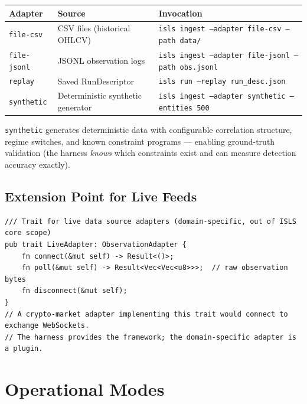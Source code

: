 \documentclass[10pt,a4paper]{article}
\begin{document}
\begin{tabular}{l l l}
\toprule \textbf{Adapter} & \textbf{Source} & \textbf{Invocation} \\
\midrule
\texttt{file-csv} & CSV files (historical OHLCV) & \texttt{isls ingest --adapter file-csv --path data/} \\
\texttt{file-jsonl} & JSONL observation logs & \texttt{isls ingest --adapter file-jsonl --path obs.jsonl} \\
\texttt{replay} & Saved RunDescriptor & \texttt{isls run --replay run\_desc.json} \\
\texttt{synthetic} & Deterministic synthetic generator & \texttt{isls ingest --adapter synthetic --entities 500} \\
\bottomrule
\end{tabular}

\texttt{synthetic} generates deterministic data with configurable correlation structure, regime switches, and known constraint programs --- enabling ground-truth validation (the harness \emph{knows} which constraints exist and can measure detection accuracy exactly).

\subsection{Extension Point for Live Feeds}

\begin{lstlisting}[style=rust]
/// Trait for live data source adapters (domain-specific, out of ISLS core scope)
pub trait LiveAdapter: ObservationAdapter {
    fn connect(&mut self) -> Result<()>;
    fn poll(&mut self) -> Result<Vec<Vec<u8>>>;  // raw observation bytes
    fn disconnect(&mut self);
}
// A crypto-market adapter implementing this trait would connect to exchange WebSockets.
// The harness provides the framework; the domain-specific adapter is a plugin.
\end{lstlisting}

\section{Operational Modes}
\label{sec:modes}
\end{document}

